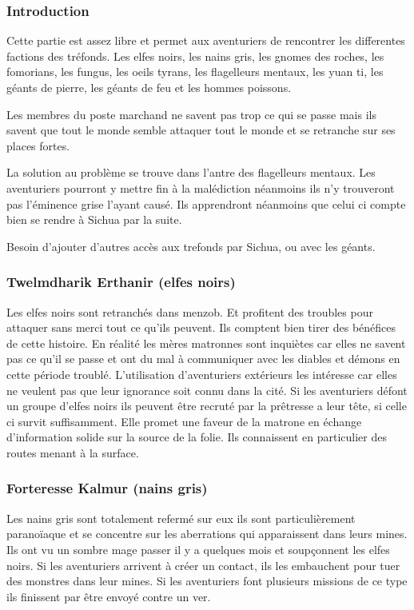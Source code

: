 \subsubsection*{Introduction}

Cette partie est assez libre et permet aux aventuriers de rencontrer les differentes 
factions des tréfonds. Les elfes noirs, les nains gris, les gnomes des roches, les 
fomorians, les fungus, les oeils tyrans, les flagelleurs mentaux, les yuan ti, les 
géants de pierre, les géants de feu et les hommes poissons.

 Les membres du poste marchand ne savent pas trop ce qui se passe mais ils savent que tout le monde semble attaquer tout le monde et se retranche sur ses places fortes.

La solution au problème se trouve dans l'antre des flagelleurs mentaux. Les aventuriers pourront y mettre fin à la malédiction néanmoins ils n'y trouveront pas l'éminence grise l'ayant causé. Ils apprendront néanmoins que celui ci compte bien se rendre à Sichua par la suite.

Besoin d'ajouter d'autres accès aux trefonds par Sichua, ou avec les géants.

\subsubsection*{Twelmdharik Erthanir (elfes noirs)}

Les elfes noirs sont retranchés dans menzob. Et profitent des troubles pour attaquer sans merci tout ce qu'ils peuvent. Ils comptent bien tirer des bénéfices de cette histoire. En réalité les mères matronnes sont inquiètes car elles ne savent pas ce qu'il se passe et ont du mal à communiquer avec les diables et démons en cette période troublé. L'utilisation d'aventuriers extérieurs les intéresse car elles ne veulent pas que leur ignorance soit connu dans la cité. Si les aventuriers défont un groupe d'elfes noirs ils peuvent être recruté par la prêtresse a leur tête, si celle ci survit suffisamment. Elle promet une faveur de la matrone en échange d'information solide sur la source de la folie. Ils connaissent en particulier des routes menant à la surface. 

\subsubsection*{Forteresse Kalmur (nains gris)}

Les nains gris sont totalement refermé sur eux ils sont particulièrement paranoïaque et se concentre sur les aberrations qui apparaissent dans leurs mines. Ils ont vu un sombre mage passer il y a quelques mois et soupçonnent les elfes noirs. Si les aventuriers arrivent à créer un contact, ils les embauchent pour tuer des monstres dans leur mines. Si les aventuriers font plusieurs missions de ce type ils finissent par être envoyé contre un ver.

